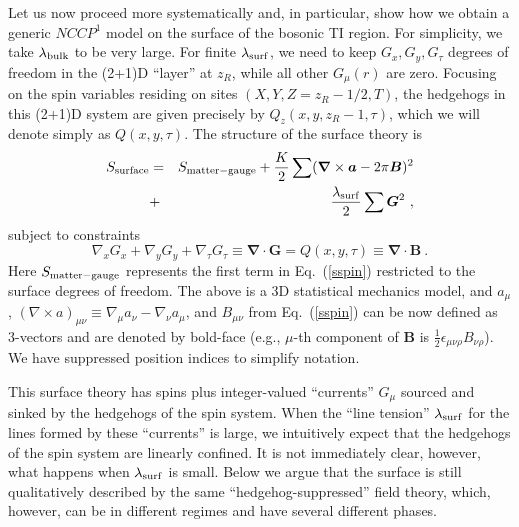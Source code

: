 Let us now proceed more systematically and, in particular, show how we obtain a generic $NCCP^1$ model on the surface of the bosonic TI region.  For simplicity, we take $\lambda_{\rm bulk}$ to be very large. For finite $\lambda_{\rm surf}$, we need to keep $G_x, G_y, G_\tau$ degrees of freedom in the (2+1)D ``layer'' at $z_R$, while all other $G_\mu(r)$ are zero.  Focusing on the spin variables residing on sites $(X, Y, Z=z_R-1/2, T)$, the hedgehogs in this (2+1)D system are given precisely by $Q_z(x, y, z_R-1, \tau)$, which we will denote simply as $Q(x, y, \tau)$.  The structure of the surface theory is
\begin{eqnarray}
S_{\rm surface} &=& S_{\rm matter-gauge} + \frac{K}{2}\sum  ({\bm\nabla} \times {\bm a} - 2\pi {\bm B})^2\nonumber \\
&+& \frac{\lambda_{\rm surf}}{2}\sum  {\bm G}^2 ~,
\label{Ssurf}
\end{eqnarray}
subject to constraints
\begin{equation}
 \nabla_x G_x + \nabla_y G_y + \nabla_\tau G_\tau \equiv {\bm \nabla} \cdot {\bm G} = Q(x,y,\tau) \equiv {\bm \nabla} \cdot {\bm B} ~.
\end{equation}
Here $S_{\rm matter-gauge}$ represents the first term in Eq.~(\ref{sspin}) restricted to the surface degrees of freedom. The above is a 3D statistical mechanics model, and $a_\mu$, $(\nabla\times a)_{\mu\nu} \equiv \nabla_\mu a_\nu -\nabla_\nu a_\mu$, and $B_{\mu\nu}$ from Eq.~(\ref{sspin}) can be now defined as 3-vectors and are denoted by bold-face (e.g., $\mu$-th component of ${\bm B}$ is $\frac{1}{2}\epsilon_{\mu\nu\rho}B_{\nu\rho}$). We have suppressed position indices to simplify notation.

This surface theory has spins plus integer-valued ``currents'' $G_\mu$ sourced and sinked by the hedgehogs of the spin system.  When the ``line tension'' $\lambda_{\rm surf}$ for the lines formed by these ``currents'' is large, we intuitively expect that the hedgehogs of the spin system are linearly confined.  It is not immediately clear, however, what happens when $\lambda_{\rm surf}$ is small.  Below we argue that the surface is still qualitatively described by the same ``hedgehog-suppressed'' field theory, which, however, can be in different regimes and have several different phases.

